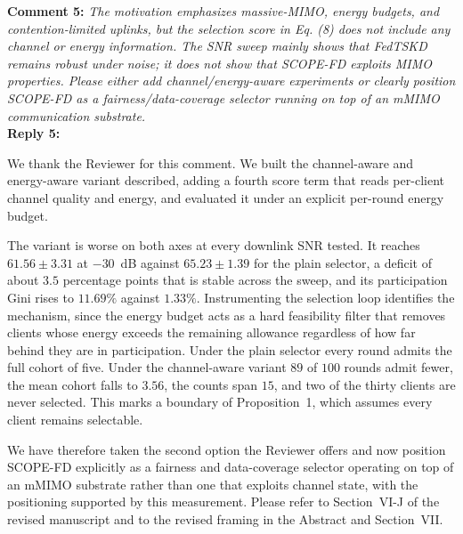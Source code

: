 \documentclass[10pt]{article}
\begin{document}
\noindent
\textbf{Comment 5:} \textit{The motivation emphasizes massive-MIMO, energy budgets, and contention-limited uplinks, but the selection score in Eq. (8) does not include any channel or energy information. The SNR sweep mainly shows that FedTSKD remains robust under noise; it does not show that SCOPE-FD exploits MIMO properties. Please either add channel/energy-aware experiments or clearly position SCOPE-FD as a fairness/data-coverage selector running on top of an mMIMO communication substrate.} \\
\noindent
\textbf{Reply 5:} {We thank the Reviewer for this comment. We built the channel-aware and energy-aware variant described, adding a fourth score term that reads per-client channel quality and energy, and evaluated it under an explicit per-round energy budget.

The variant is worse on both axes at every downlink SNR tested. It reaches $61.56 \pm 3.31$ at $-30$~dB against $65.23 \pm 1.39$ for the plain selector, a deficit of about $3.5$ percentage points that is stable across the sweep, and its participation Gini rises to $11.69\%$ against $1.33\%$. Instrumenting the selection loop identifies the mechanism, since the energy budget acts as a hard feasibility filter that removes clients whose energy exceeds the remaining allowance regardless of how far behind they are in participation. Under the plain selector every round admits the full cohort of five. Under the channel-aware variant $89$ of $100$ rounds admit fewer, the mean cohort falls to $3.56$, the counts span $15$, and two of the thirty clients are never selected. This marks a boundary of Proposition~1, which assumes every client remains selectable.

We have therefore taken the second option the Reviewer offers and now position SCOPE-FD explicitly as a fairness and data-coverage selector operating on top of an mMIMO substrate rather than one that exploits channel state, with the positioning supported by this measurement. Please refer to Section~VI-J of the revised manuscript and to the revised framing in the Abstract and Section~VII.}\\
\end{document}
